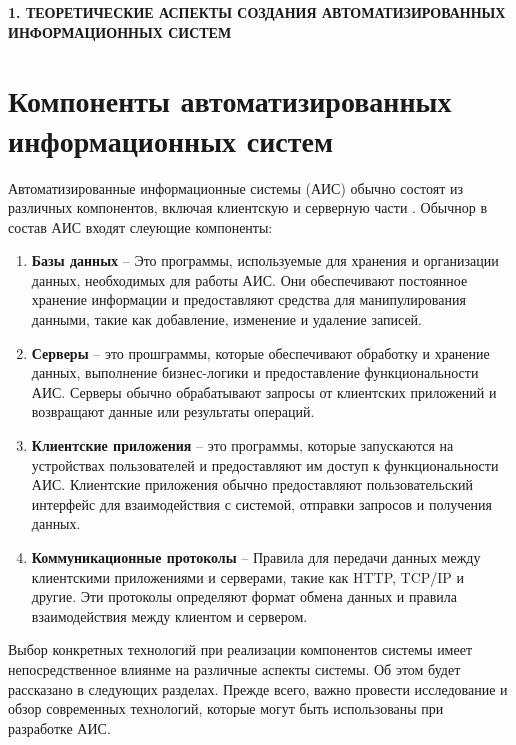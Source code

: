 \newpage
\begin{center}
    \textbf{\large 1. ТЕОРЕТИЧЕСКИЕ АСПЕКТЫ СОЗДАНИЯ АВТОМАТИЗИРОВАННЫХ ИНФОРМАЦИОННЫХ СИСТЕМ}
\end{center}



\section{Компоненты автоматизированных информационных систем}
Автоматизированные информационные системы (АИС) обычно состоят из различных компонентов, 
включая клиентскую и серверную части \cite{Ais2020}.
Обычнор в состав АИС входят слеующие компоненты:

\begin{enumerate}
    \item \textbf{Базы данных} -- Это программы, используемые для хранения и организации данных, необходимых для работы АИС. 
    Они обеспечивают постоянное хранение информации и предоставляют средства для манипулирования данными, 
    такие как добавление, изменение и удаление записей.
    
    \item \textbf{Серверы} -- это прошграммы, которые обеспечивают обработку и хранение данных, 
    выполнение бизнес-логики и предоставление функциональности АИС. 
    Серверы обычно обрабатывают запросы от клиентских приложений и возвращают данные или результаты операций.
    
    \item \textbf{Клиентские приложения} -- это программы, которые запускаются на устройствах пользователей и предоставляют им доступ к функциональности АИС. 
    Клиентские приложения обычно предоставляют пользовательский интерфейс для взаимодействия с системой, 
    отправки запросов и получения данных.
    
    \item \textbf{Коммуникационные протоколы} -- Правила для передачи данных между клиентскими приложениями и серверами, такие как HTTP, TCP/IP и другие. 
    Эти протоколы определяют формат обмена данных и правила взаимодействия между клиентом и сервером.
\end{enumerate}

Выбор конкретных технологий при реализации компонентов системы имеет непосредственное влиянме на различные аспекты системы. Об этом будет рассказано в следующих разделах.
Прежде всего, важно провести исследование и обзор современных технологий, которые могут быть использованы при разработке АИС.




